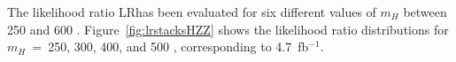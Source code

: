 The likelihood ratio LRhas been evaluated for six different values of $m_H$ between 250 and 600 \GeVcc.
Figure~\ref{fig:lrstacksHZZ} shows the likelihood ratio distributions for $m_H$~=~250, 300, 400, and 500 \GeVcc,               
corresponding to 4.7~fb$^{-1}$.

\begin{figure}[!hbtp]                                                                                         
\centering                                                                                                    
\end{figure}
